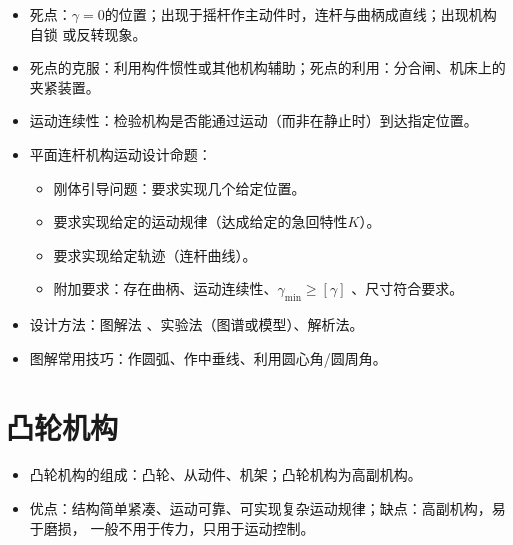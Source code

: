 \documentclass[12pt,a4paper]{article}
\newcommand{\tightlist}{\setlength{\parskip}{0pt}\setlength{\itemsep}{0pt}}
\newcommand{\hint}[1]{\textsf{（#1）}}
\newcommand{\minor}[1]{{\color{gray} #1}}
\begin{document}
\begin{itemize}
    \item 死点：$\gamma=0$的位置；出现于摇杆作主动件时，连杆与曲柄成直线；出现机构自锁
    或反转现象。
    \item \minor{死点的克服：利用构件惯性或其他机构辅助；死点的利用：分合闸、机床上的
    夹紧装置。}
    \item 运动连续性：检验机构是否能通过运动\hint{而非在静止时}到达指定位置。
    \item 平面连杆机构运动设计命题：
    \begin{itemize}\tightlist
        \item 刚体引导问题：要求实现几个给定位置。
        \item 要求实现给定的运动规律\hint{达成给定的急回特性$K$}。
        \item \minor{要求实现给定轨迹\hint{连杆曲线}。}
        \item 附加要求：存在曲柄、运动连续性、$\gamma_\text{min}\geq[\gamma]$\minor%
        {、尺寸符合要求}。
    \end{itemize}
    \item 设计方法：图解法\minor{、实验法\hint{图谱或模型}、解析法}。
    \item 图解常用技巧：作圆弧、作中垂线、利用圆心角/圆周角。
\end{itemize}

\section{凸轮机构}
\begin{itemize}\tightlist
    \item 凸轮机构的组成：凸轮、从动件、机架；凸轮机构为高副机构。
    \item 优点：结构简单紧凑、运动可靠、可实现复杂运动规律；缺点：高副机构，易于磨损，
    一般不用于传力，只用于运动控制。
\end{itemize}
\end{document}
